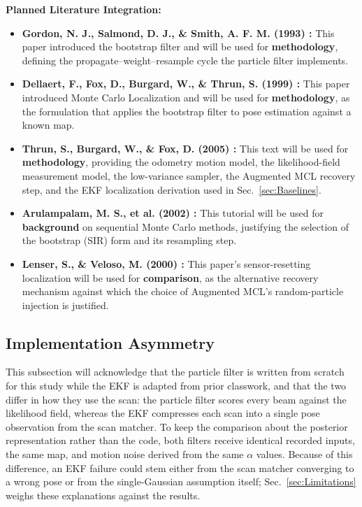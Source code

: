 \documentclass[conf]{new-aiaa}
\begin{document}
\vspace{0.5em}\noindent\textbf{Planned Literature Integration:}
\begin{itemize}
    \item \textbf{Gordon, N. J., Salmond, D. J., \& Smith, A. F. M. (1993) \cite{gordon1993novel}:} This paper introduced the bootstrap filter and will be used for \textbf{methodology}, defining the propagate--weight--resample cycle the particle filter implements.
    \item \textbf{Dellaert, F., Fox, D., Burgard, W., \& Thrun, S. (1999) \cite{dellaert1999monte}:} This paper introduced Monte Carlo Localization and will be used for \textbf{methodology}, as the formulation that applies the bootstrap filter to pose estimation against a known map.
    \item \textbf{Thrun, S., Burgard, W., \& Fox, D. (2005) \cite{thrun2005probabilistic}:} This text will be used for \textbf{methodology}, providing the odometry motion model, the likelihood-field measurement model, the low-variance sampler, the Augmented MCL recovery step, and the EKF localization derivation used in Sec.~\ref{sec:Baselines}.
    \item \textbf{Arulampalam, M. S., et al. (2002) \cite{arulampalam2002tutorial}:} This tutorial will be used for \textbf{background} on sequential Monte Carlo methods, justifying the selection of the bootstrap (SIR) form and its resampling step.
    \item \textbf{Lenser, S., \& Veloso, M. (2000) \cite{lenser2000sensor}:} This paper's sensor-resetting localization will be used for \textbf{comparison}, as the alternative recovery mechanism against which the choice of Augmented MCL's random-particle injection is justified.
\end{itemize}

\subsection{Implementation Asymmetry}\label{sec:Asymmetry}
This subsection will acknowledge that the particle filter is written from scratch for this study while the EKF is adapted from prior classwork, and that the two differ in how they use the scan: the particle filter scores every beam against the likelihood field, whereas the EKF compresses each scan into a single pose observation from the scan matcher. To keep the comparison about the posterior representation rather than the code, both filters receive identical recorded inputs, the same map, and motion noise derived from the same $\alpha$ values. Because of this difference, an EKF failure could stem either from the scan matcher converging to a wrong pose or from the single-Gaussian assumption itself; Sec.~\ref{sec:Limitations} weighs these explanations against the results.
\end{document}
